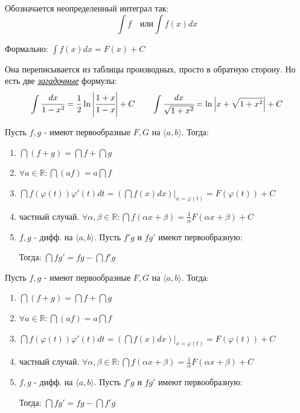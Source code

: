 Обозначается неопределенный интеграл так:
$$\int f \quad \text{или} \int f(x) dx $$

Формально: $\displaystyle \int f(x)dx = F(x) +C$


Она переписывается из таблицы производных, просто в обратную сторону. Но есть две \uline{\emph{загадочные}} формулы:
     $$\displaystyle \int \cfrac{dx}{1-x^2} = \frac{1}{2}\ln \left|\cfrac{1+x}{1-x}\right| + C \quad \quad \int \cfrac{dx}{\sqrt{1+x^2}} = \ln \left|x + \sqrt{1+x^2}\right| + C$$


Пусть $f,g$ - имеют первообразные $F,G$ на $\langle a,b \rangle$. Тогда:

\begin{enumerate}
    \item $\dint (f+g) = \dint f + \dint g$
    \item $\forall a \in \mathbb{R}: \dint (af)=a\dint f$
    \item $\dint f(\varphi(t))\varphi'(t)dt = \left(\dint f(x)dx\right)\Big |_{x=\varphi(t)}= F(\varphi(t)) + C$
    \item частный случай. $\forall \alpha,\beta \in \mathbb{R}:\dint f(\alpha x + \beta) = \frac{1}{\alpha}F(\alpha x+\beta) + C$
    \item $f,g$ - дифф. на $\langle a,b\rangle$. Пусть $f'g$ и $fg'$ имеют первообразную: 
    
    Тогда: $\dint f g' = fg -\dint f'g$
\end{enumerate}

Пусть $f,g$ - имеют первообразные $F,G$ на $\langle a,b \rangle$. Тогда:

\begin{enumerate}
    \item $\dint (f+g) = \dint f + \dint g$
    \item $\forall a \in \mathbb{R}: \dint (af)=a\dint f$
    \item $\dint f(\varphi(t))\varphi'(t)dt = \left(\dint f(x)dx\right)\Big |_{x=\varphi(t)}= F(\varphi(t)) + C$
    \item частный случай. $\forall \alpha,\beta \in \mathbb{R}:\dint f(\alpha x + \beta) = \frac{1}{\alpha}F(\alpha x+\beta) + C$
    \item $f,g$ - дифф. на $\langle a,b\rangle$. Пусть $f'g$ и $fg'$ имеют первообразную: 
    
    Тогда: $\dint f g' = fg -\dint f'g$
\end{enumerate}


